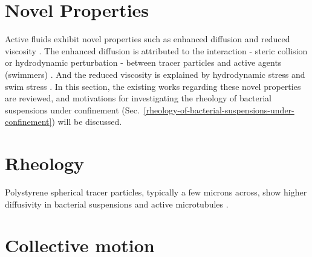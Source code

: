 \section{Novel Properties}
\label{emergent-properties}
Active fluids exhibit novel properties such as enhanced diffusion and reduced viscosity \cite{Ramaswamy2010}. The enhanced diffusion is attributed to the interaction - steric collision or hydrodynamic perturbation - between tracer particles and active agents (swimmers)
\cite{Wu2000, Peng2016, Caspi2000, Morozov2014, Patteson2016, Leptos2009,
 Yang2016, Valeriani2011, Kurtuldu2011}.
And the reduced viscosity is explained by hydrodynamic stress and swim stress \cite{}. In this section, the existing works regarding these novel properties are reviewed, and motivations for investigating the rheology of bacterial suspensions under confinement (Sec.~\ref{rheology-of-bacterial-suspensions-under-confinement}) will be discussed.


\section{Rheology}
Polystyrene spherical tracer particles, typically a few microns across, show higher diffusivity in bacterial suspensions and active microtubules \cite{Wu2000, Caspi2000}.

\section{Collective motion}
